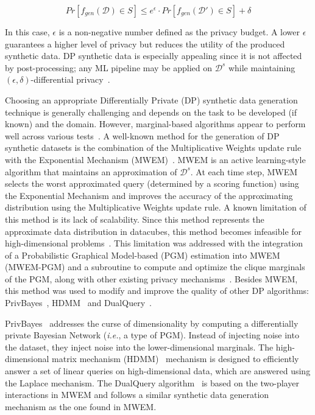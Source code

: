\begin{equation}
    Pr[f_{gen}(\mathcal{D}) \in S] \le e^{\epsilon} \cdot
    Pr[f_{gen}(\mathcal{D}') \in S] + \delta
\end{equation}
 
In this case, $\epsilon$ is a non-negative number defined as the privacy
budget. A lower $\epsilon$ guarantees a higher level of privacy but reduces
the utility of the produced synthetic data. DP synthetic data is especially
appealing since it is not affected by post-processing; any ML pipeline may be
applied on $\mathcal{D}^s$ while maintaining $(\epsilon, \delta)$-differential
privacy~\cite{dwork2014algorithmic}.

Choosing an appropriate Differentially Private (DP) synthetic data generation
technique is generally challenging and depends on the task to be developed (if
known) and the domain. However, marginal-based algorithms appear to perform
well across various tests~\cite{tao2021benchmarking}. A well-known method for
the generation of DP synthetic datasets is the combination of the
Multiplicative Weights update rule with the Exponential Mechanism
(MWEM)~\cite{hardt2012simple}. MWEM is an active learning-style algorithm that
maintains an approximation of $\mathcal{D}^s$. At each time step, MWEM selects
the worst approximated query (determined by a scoring function) using the
Exponential Mechanism and improves the accuracy of the approximating
distribution using the Multiplicative Weights update rule. A known limitation
of this method is its lack of scalability. Since this method represents the
approximate data distribution in datacubes, this method becomes infeasible for
high-dimensional problems~\cite{mckenna2019graphical}. This limitation was
addressed with the integration of a Probabilistic Graphical Model-based (PGM)
estimation into MWEM (MWEM-PGM) and a subroutine to compute and optimize the
clique marginals of the PGM, along with other existing privacy
mechanisms~\cite{mckenna2019graphical}. Besides MWEM, this method was used to
modify and improve the quality of other DP algorithms:
PrivBayes~\cite{zhang2017privbayes}, HDMM~\cite{mckenna2018optimizing} and
DualQuery~\cite{gaboardi2014dual}.

PrivBayes~\cite{zhang2017privbayes} addresses the curse of dimensionality by
computing a differentially private Bayesian Network (\textit{i.e.}, a type of
PGM). Instead of injecting noise into the dataset, they inject noise into the
lower-dimensional marginals. The high-dimensional matrix mechanism
(HDMM)~\cite{mckenna2018optimizing} mechanism is designed to efficiently
answer a set of linear queries on high-dimensional data, which are answered
using the Laplace mechanism. The DualQuery algorithm~\cite{gaboardi2014dual}
is based on the two-player interactions in MWEM and follows a similar
synthetic data generation mechanism as the one found in MWEM\@.


